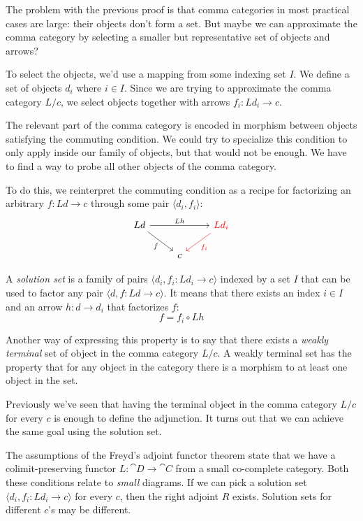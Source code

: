 \documentclass[DaoFP]{subfiles}
\begin{document}
The problem with the previous proof is that comma categories in most practical cases are large: their objects don't form a set. But maybe we can approximate the comma category by selecting a smaller but representative set of objects and arrows?

To select the objects, we'd use a mapping from some indexing set $I$. We define a set of objects $d_i$ where $i \in I$. Since we are trying to approximate the comma category $L/c$, we select objects together with arrows $f_i \colon L d_i \to c$. 

The relevant part of the comma category is encoded in morphism between objects satisfying the commuting condition. We could try to specialize this condition to only apply inside our family of objects, but that would not be enough. We have to find a way to probe all other objects of the comma category. 

To do this, we reinterpret the commuting condition as a recipe for factorizing an arbitrary $f \colon L d \to c$ through some pair $\langle d_i, f_i \rangle$:
\[
 \begin{tikzcd}
 L d
 \arrow[rd, "f"']
 \arrow[rr, "L h"]
 && \textcolor{red}{L d_i}
 \arrow[ld, red, "f_i"]
 \\
 &c
  \end{tikzcd}
\]

A \emph{solution set} is a family of pairs $\langle d_i, f_i \colon L d_i \to c \rangle $ indexed by a set $I$ that can be used to factor any pair $\langle d, f \colon L d \to c \rangle $. It means that there exists an index $i \in I$ and an arrow $h \colon d \to d_i$ that factorizes $f$:
\[ f = f_i \circ L h \]

Another way of expressing this property is to say that there exists a \emph{weakly terminal} set of object in the comma category $L/c$. A weakly terminal set has the property that for any object in the category there is a morphism to at least one object in the set.

Previously we've seen that having the terminal object in the comma category $L/c$ for every $c$ is enough to define the adjunction. It turns out that we can achieve the same goal using the solution set. 

The assumptions of the Freyd's adjoint functor theorem state that we have a colimit-preserving functor $L \colon \cat D \to \cat C$ from a small co-complete category. Both these conditions relate to \emph{small} diagrams. If we can pick a solution set $\langle d_i, f_i \colon L d_i \to c \rangle $ for every $c$, then the right adjoint $R$ exists. Solution sets for different $c$'s may be different.
\end{document}
